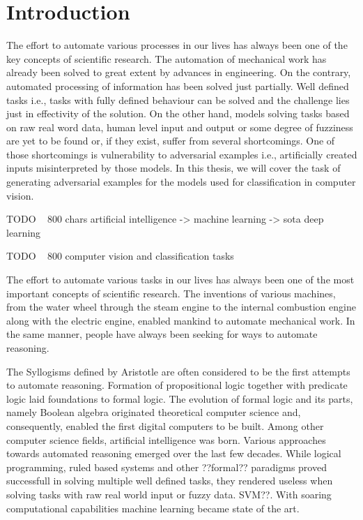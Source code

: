 \chapter*{Introduction}

The effort to automate various processes in our lives has always been one of the key concepts of scientific research. The automation of mechanical work has already been solved to great extent by advances in engineering. On the contrary, automated processing of information has been solved just partially. Well defined tasks i.e., tasks with fully defined behaviour can be solved and the challenge lies just in effectivity of the solution. On the other hand, models solving tasks based on raw real word data, human level input and output or some degree of fuzziness are yet to be found or, if they exist, suffer from several shortcomings. One of those shortcomings is vulnerability to adversarial examples i.e., artificially created inputs misinterpreted by those models. In this thesis, we will cover the task of generating adversarial examples for the models used for classification in computer vision.

TODO ~ 800 chars artificial intelligence -> machine learning -> sota deep learning

TODO ~ 800 computer vision and classification tasks


The effort to automate various tasks in our lives has always been one of the most important concepts of scientific research. The inventions of various machines, from the water wheel through the steam engine to the internal combustion engine along with the electric engine, enabled mankind to automate mechanical work. In the same manner, people have always been seeking for ways to automate reasoning.

The Syllogisms defined by Aristotle are often considered to be the first attempts to automate reasoning. Formation of propositional logic together with predicate logic laid foundations to formal logic. The evolution of formal logic and its parts, namely Boolean algebra originated theoretical computer science and, consequently, enabled the first digital computers to be built. Among other computer science fields, artificial intelligence was born. Various approaches towards automated reasoning emerged over the last few decades. While logical programming, ruled based systems and other ??formal?? paradigms proved successfull in solving multiple well defined tasks, they rendered useless when solving tasks with raw real world input or fuzzy data. SVM??. With soaring computational capabilities machine learning became state of the art.

